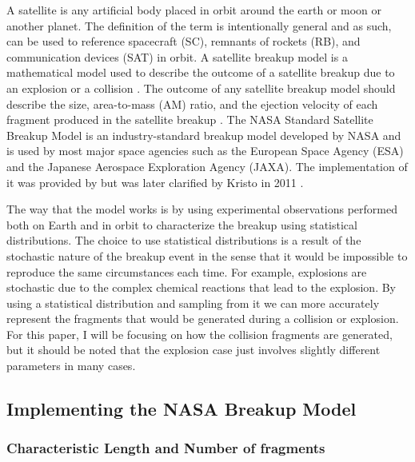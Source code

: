 \documentclass{article}
\begin{document}
A satellite is any artificial body placed in orbit around the earth or moon or another planet. The definition of the term is intentionally general and as such, can be used to reference spacecraft (SC), remnants of rockets (RB), and communication devices (SAT) in orbit.  A satellite breakup model is a mathematical model used to describe the outcome of a satellite breakup due to an explosion or a collision \citep{jer_chyi_liou_orbital_nodate}.  The outcome of any satellite breakup model should describe the size, area-to-mass (AM) ratio, and the ejection velocity of each fragment produced in the satellite breakup \citep{johnson_nasas_2001}. The NASA Standard Satellite Breakup Model is an industry-standard breakup model developed by NASA and is used by most major space agencies such as the European Space Agency (ESA) and the Japanese Aerospace Exploration Agency (JAXA). The implementation of it was provided by \cite{johnson_nasas_2001} but was later clarified by Kristo in 2011 \citep{krisko_proper_2011}. 

The way that the model works is by using experimental observations performed both on Earth and in orbit to characterize the breakup using statistical distributions. The choice to use statistical distributions is a result of the stochastic nature of the breakup event in the sense that it would be impossible to reproduce the same circumstances each time. For example, explosions are stochastic due to the complex chemical reactions that lead to the explosion.  By using a statistical distribution and sampling from it we can more accurately represent the fragments that would be generated during a collision or explosion. For this paper, I will be focusing on how the collision fragments are generated, but it should be noted that the explosion case just involves slightly different parameters in many cases.

\newpage

\subsection{Implementing the NASA Breakup Model}

\subsubsection{Characteristic Length and Number of fragments}
\end{document}
